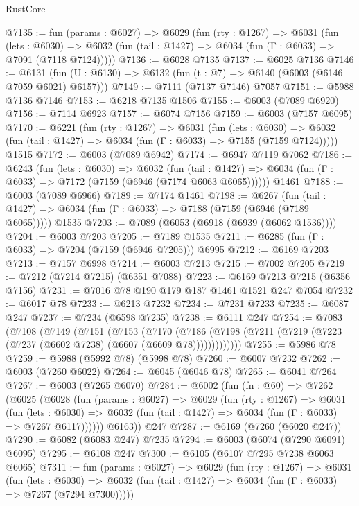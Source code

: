 \begin{lexlean}{RustCore}
\begin{coremodule}
@7135 := fun (params : @6027) =>
  @6029
    (fun (rty : @1267) =>
    @6031
      (fun (lets : @6030) =>
      @6032 (fun (tail : @1427) => @6034 (fun (Γ : @6033) => @7091 (@7118 @7124)))))
@7136 := @6028 @7135
@7137 := @6025 @7136
@7146 := @6131 (fun (U : @6130) => @6132 (fun (t : @7) => @6140 (@6003 (@6146 @7059 @6021) @6157)))
@7149 := @7111 (@7137 @7146) @7057
@7151 := @5988 @7136 @7146
@7153 := @6218 @7135 @1506
@7155 := @6003 (@7089 @6920)
@7156 := @7114 @6923
@7157 := @6074 @7156
@7159 := @6003 (@7157 @6095)
@7170 := @6221
    (fun (rty : @1267) =>
    @6031
      (fun (lets : @6030) =>
      @6032 (fun (tail : @1427) => @6034 (fun (Γ : @6033) => @7155 (@7159 @7124)))))
    @1515
@7172 := @6003 (@7089 @6942)
@7174 := @6947 @7119 @7062
@7186 := @6243
    (fun (lets : @6030) =>
    @6032
      (fun (tail : @1427) => @6034 (fun (Γ : @6033) => @7172 (@7159 (@6946 (@7174 @6063 @6065))))))
    @1461
@7188 := @6003 (@7089 @6966)
@7189 := @7174 @1461
@7198 := @6267
    (fun (tail : @1427) => @6034 (fun (Γ : @6033) => @7188 (@7159 (@6946 (@7189 @6065)))))
    @1535
@7203 := @7089 (@6053 (@6918 (@6939 (@6062 @1536))))
@7204 := @6003 @7203
@7205 := @7189 @1535
@7211 := @6285 (fun (Γ : @6033) => @7204 (@7159 (@6946 @7205))) @6995
@7212 := @6169 @7203
@7213 := @7157 @6998
@7214 := @6003 @7213
@7215 := @7002 @7205
@7219 := @7212 (@7214 @7215) (@6351 @7088)
@7223 := @6169 @7213 @7215 (@6356 @7156)
@7231 := @7016 @78 @190 @179 @187 @1461 @1521 @247 @7054
@7232 := @6017 @78
@7233 := @6213 @7232
@7234 := @7231 @7233
@7235 := @6087 @247
@7237 := @7234 (@6598 @7235)
@7238 := @6111 @247
@7254 := @7083
    (@7108
      (@7149
        (@7151
          (@7153
            (@7170
              (@7186 (@7198 (@7211 (@7219 (@7223 (@7237 (@6602 @7238) (@6607 (@6609 @78)))))))))))))
@7255 := @5986 @78
@7259 := @5988 (@5992 @78) (@5998 @78)
@7260 := @6007 @7232
@7262 := @6003 (@7260 @6022)
@7264 := @6045 (@6046 @78)
@7265 := @6041 @7264
@7267 := @6003 (@7265 @6070)
@7284 := @6002
    (fun (fn : @60) =>
    @7262
      (@6025
        (@6028
          (fun (params : @6027) =>
          @6029
            (fun (rty : @1267) =>
            @6031
              (fun (lets : @6030) =>
              @6032 (fun (tail : @1427) => @6034 (fun (Γ : @6033) => @7267 @6117))))))
        @6163))
    @247
@7287 := @6169 (@7260 (@6020 @247))
@7290 := @6082 (@6083 @247) @7235
@7294 := @6003 (@6074 (@7290 @6091) @6095)
@7295 := @6108 @247
@7300 := @6105 (@6107 @7295 @7238 @6063 @6065)
@7311 := fun (params : @6027) =>
  @6029
    (fun (rty : @1267) =>
    @6031
      (fun (lets : @6030) =>
      @6032 (fun (tail : @1427) => @6034 (fun (Γ : @6033) => @7267 (@7294 @7300)))))

\end{coremodule}
\end{lexlean}
